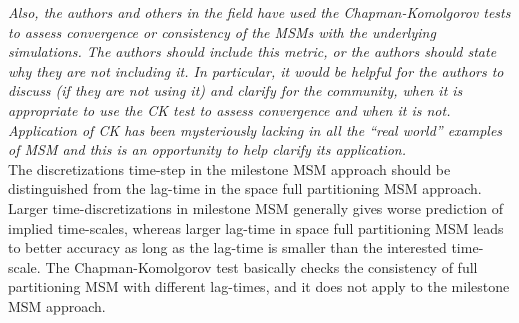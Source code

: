 \documentclass{article}
\begin{document}
\textit{ Also, the authors and others in the field have used the
  Chapman-Komolgorov tests to assess convergence or consistency of the
  MSMs with the underlying simulations.  The authors should include
  this metric, or the authors should state why they are not including
  it.  In particular, it would be helpful for the authors to discuss
  (if they are not using it) and clarify for the community, when it is
  appropriate to use the CK test to assess convergence and when it is
  not. Application of CK has been mysteriously lacking in all the
  “real world” examples of MSM and this is an opportunity to help
  clarify its application.
}\\

The discretizations time-step in the milestone MSM approach should be
distinguished from the lag-time in the space full partitioning MSM
approach. Larger time-discretizations in milestone MSM generally gives
worse prediction of implied time-scales, whereas larger lag-time in
space full partitioning MSM leads to better accuracy as long as the
lag-time is smaller than the interested time-scale. The
Chapman-Komolgorov test basically checks the consistency of full
partitioning MSM with different lag-times, and it does not apply to
the milestone MSM approach.
\end{document}
